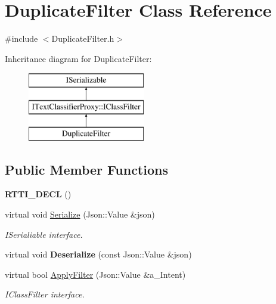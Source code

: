 \hypertarget{class_duplicate_filter}{}\section{Duplicate\+Filter Class Reference}
\label{class_duplicate_filter}


{\ttfamily \#include $<$Duplicate\+Filter.\+h$>$}

Inheritance diagram for Duplicate\+Filter\+:\begin{figure}[H]
\begin{center}
\leavevmode
\includegraphics[height=3.000000cm]{class_duplicate_filter}
\end{center}
\end{figure}
\subsection*{Public Member Functions}
\begin{DoxyCompactItemize}
\item 
\mbox{\label{class_duplicate_filter_a64917174d78b20ea83040237069f334b}} 
{\bfseries R\+T\+T\+I\+\_\+\+D\+E\+CL} ()
\item 
\mbox{\label{class_duplicate_filter_af83da16afc47b3e76585cafa2b79fe3b}} 
virtual void \hyperlink{class_duplicate_filter_af83da16afc47b3e76585cafa2b79fe3b}{Serialize} (Json\+::\+Value \&json)
\begin{DoxyCompactList}\small\item\em I\+Serialiable interface. \end{DoxyCompactList}\item 
\mbox{\label{class_duplicate_filter_a88fc1ec78931b4c6545e76c8e9ea9843}} 
virtual void {\bfseries Deserialize} (const Json\+::\+Value \&json)
\item 
\mbox{\label{class_duplicate_filter_a7acbdcc9396eca917a2567d986175ea8}} 
virtual bool \hyperlink{class_duplicate_filter_a7acbdcc9396eca917a2567d986175ea8}{Apply\+Filter} (Json\+::\+Value \&a\+\_\+\+Intent)
\begin{DoxyCompactList}\small\item\em I\+Class\+Filter interface. \end{DoxyCompactList}\end{DoxyCompactItemize}
